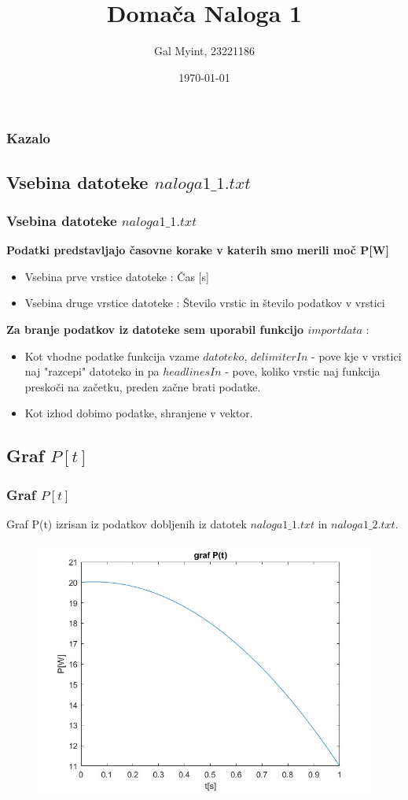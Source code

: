 \documentclass[10pt]{beamer}
\title{Domača Naloga 1}
\author{Gal Myint, 23221186}
\institute{Fakulteta za strojništvo, Univerza v Ljubljani}
\date{\today}
\begin{document}
 
\frame{\titlepage}

\begin{frame}
\frametitle{Kazalo}
 \tableofcontents[sectionstyle=show, subsectionstyle=show]
\end{frame}

\begin{frame} 
\section{Vsebina datoteke $naloga1\_1.txt$}
\frametitle{Vsebina datoteke $naloga1\_ 1.txt$}
\textbf{Podatki predstavljajo časovne korake v katerih smo merili moč P[W]}
\begin{itemize}
    \item Vsebina prve vrstice datoteke : Čas [s]
    \item Vsebina druge vrstice datoteke : Število vrstic in število podatkov v vrstici
\end{itemize}
\vspace{5pt}
\textbf{Za branje podatkov iz datoteke sem uporabil funkcijo $importdata$} :
\begin{itemize}
    \item Kot vhodne podatke funkcija vzame $datoteko$, $delimiterIn$ - pove kje v vrstici naj "razcepi" datoteko in pa $headlinesIn$ - pove, koliko vrstic naj funkcija preskoči na začetku, preden začne brati podatke.
    \item Kot izhod dobimo podatke, shranjene v vektor.
\end{itemize}
\end{frame}
\begin{frame} 


\section{Graf $P[t]$}
\frametitle{Graf $P[t]$}  
\vspace{10pt}
Graf P(t) izrisan iz podatkov dobljenih iz datotek $naloga1\_1.txt$ in $naloga1\_2.txt$.
\begin{figure}
    \centering
    \includegraphics[width=0.9\linewidth]{grafP(t).jpg}
    \label{P(t)}
\end{figure}
\end{frame} 
\end{document}
